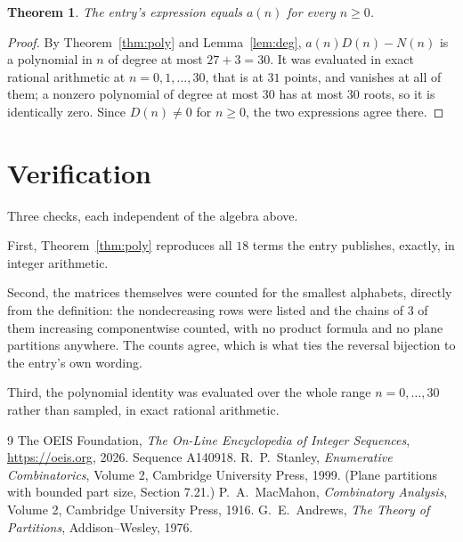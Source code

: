 \documentclass[11pt,a4paper]{article}
\theoremstyle{plain}
\newtheorem{theorem}{Theorem}
\theoremstyle{definition}
\begin{document}
\begin{theorem}
The entry's expression equals $a(n)$ for every $n\ge0$.
\end{theorem}

\begin{proof}
By Theorem~\ref{thm:poly} and Lemma~\ref{lem:deg}, $a(n)D(n)-N(n)$ is a polynomial in $n$
of degree at most $27+3=30$. It was evaluated in exact rational arithmetic at
$n=0,1,\dots,30$, that is at $31$ points, and vanishes at all of them; a nonzero polynomial
of degree at most $30$ has at most $30$ roots, so it is identically zero. Since $D(n)\neq0$
for $n\ge0$, the two expressions agree there.
\end{proof}

\section{Verification}

Three checks, each independent of the algebra above.

First, Theorem~\ref{thm:poly} reproduces all $18$ terms the entry publishes,
exactly, in integer arithmetic.

Second, the matrices themselves were counted for the smallest alphabets, directly from the
definition: the nondecreasing rows were listed and the chains of $3$ of them increasing
componentwise counted, with no product formula and no plane partitions anywhere. The counts
agree, which is what ties the reversal bijection to the entry's own wording.

Third, the polynomial identity was evaluated over the whole range $n=0,\dots,30$ rather than
sampled, in exact rational arithmetic.

\begin{thebibliography}{9}
 The OEIS Foundation, \emph{The On-Line Encyclopedia of Integer
Sequences}, \url{https://oeis.org}, 2026. Sequence A140918.
 R.~P.~Stanley, \emph{Enumerative Combinatorics}, Volume 2, Cambridge
University Press, 1999. (Plane partitions with bounded part size, Section 7.21.)
 P.~A.~MacMahon, \emph{Combinatory Analysis}, Volume 2, Cambridge
University Press, 1916.
 G.~E.~Andrews, \emph{The Theory of Partitions}, Addison--Wesley, 1976.
\end{thebibliography}
\end{document}
